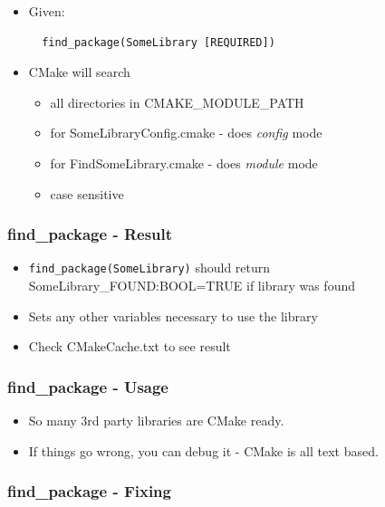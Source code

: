 \begin{itemize}
\item
  Given:

\begin{verbatim}
  find_package(SomeLibrary [REQUIRED])
\end{verbatim}
\item
  CMake will search

  \begin{itemize}
  \itemsep1pt\parskip0pt
  \item
    all directories in CMAKE\_MODULE\_PATH
  \item
    for SomeLibraryConfig.cmake - does \emph{config} mode
  \item
    for FindSomeLibrary.cmake - does \emph{module} mode
  \item
    case sensitive
  \end{itemize}
\end{itemize}

\subsubsection{find\_package - Result}\label{findux5fpackage---result}

\begin{itemize}
\itemsep1pt\parskip0pt
\item
  \texttt{find\_package(SomeLibrary)} should return
  SomeLibrary\_FOUND:BOOL=TRUE if library was found
\item
  Sets any other variables necessary to use the library
\item
  Check CMakeCache.txt to see result
\end{itemize}

\subsubsection{find\_package - Usage}\label{findux5fpackage---usage}

\begin{itemize}
\itemsep1pt\parskip0pt
\item
  So many 3rd party libraries are CMake ready.
\item
  If things go wrong, you can debug it - CMake is all text based.
\end{itemize}

\subsubsection{find\_package - Fixing}\label{findux5fpackage---fixing}

